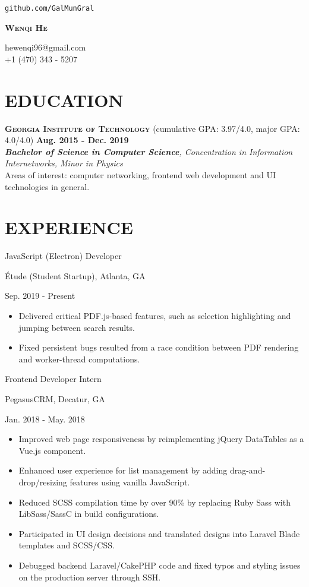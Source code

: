 \documentclass[11pt]{article}
\newcommand{\centertitle}[3]{
	{\noindent\bfseries
	\parbox[][0.5em][b]{0.35\textwidth}{#1\hfill}%
	\parbox[][0.5em][b]{0.3\textwidth}{\centerline{#2}}%
	\parbox[][0.5em][b]{0.35\textwidth}{\hfill#3}}
}
\begin{document}
\noindent
\parbox{0.25\textwidth}{\hfill\texttt{github.com/GalMunGral}}
\parbox{0.5\textwidth}{\centerline{\Huge\scshape\bfseries Wenqi He}}
\parbox{0.25\textwidth}{hewenqi96@gmail.com\\+1 (470) 343 - 5207}
%
\section*{EDUCATION}
{\large\scshape\bfseries Georgia Institute of Technology} \enspace (cumulative GPA: 3.97/4.0, major GPA: 4.0/4.0) \hfill {\bfseries Aug. 2015 - Dec. 2019}\\
{\itshape {\bfseries Bachelor of Science in Computer Science}, Concentration in Information Internetworks,  Minor in Physics}\\
\indent Areas of interest: {computer networking, frontend web development and UI technologies in general}.
\vspace{-0.5em}

\section*{EXPERIENCE}
\centertitle{JavaScript (Electron) Developer}{Étude (Student Startup), Atlanta, GA}{Sep. 2019 - Present}
\begin{itemize}[leftmargin=15pt, noitemsep, topsep=0pt]
\item Delivered critical PDF.js-based features, such as selection highlighting and jumping between search results.
\item Fixed persistent bugs resulted from a race condition between PDF rendering and worker-thread computations.
\end{itemize}
\vspace{1em}
\centertitle{Frontend Developer Intern}{PegasusCRM, Decatur, GA}{Jan. 2018 - May. 2018}
\begin{itemize}[leftmargin=15pt, noitemsep, topsep=0pt]
\item Improved web page responsiveness by reimplementing jQuery DataTables as a Vue.js component.
\item Enhanced user experience for list management by adding drag-and-drop/resizing features using vanilla JavaScript.
\item Reduced SCSS compilation time by over 90\% by replacing Ruby Sass with LibSass/SassC in build configurations.
\item Participated in UI design decisions and translated designs into Laravel Blade templates and SCSS/CSS.
\item Debugged backend Laravel/CakePHP code and fixed typos and styling issues on the production server through SSH.
\end{itemize}
\vspace{-0.5em}
\end{document}
